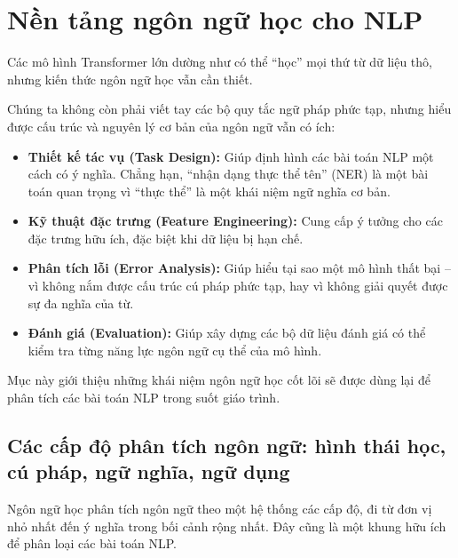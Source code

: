 
\section{Nền tảng ngôn ngữ học cho NLP}
\label{sec:nen_tang_ngon_ngu_hoc}

Các mô hình Transformer lớn dường như có thể “học” mọi thứ từ dữ liệu thô, nhưng kiến thức ngôn ngữ học vẫn cần thiết.

Chúng ta không còn phải viết tay các bộ quy tắc ngữ pháp phức tạp, nhưng hiểu được cấu trúc và nguyên lý cơ bản của ngôn ngữ vẫn có ích:
\begin{itemize}
    \item \textbf{Thiết kế tác vụ (Task Design):} Giúp định hình các bài toán NLP một cách có ý nghĩa. Chẳng hạn, “nhận dạng thực thể tên” (NER) là một bài toán quan trọng vì “thực thể” là một khái niệm ngữ nghĩa cơ bản.
    \item \textbf{Kỹ thuật đặc trưng (Feature Engineering):} Cung cấp ý tưởng cho các đặc trưng hữu ích, đặc biệt khi dữ liệu bị hạn chế.
    \item \textbf{Phân tích lỗi (Error Analysis):} Giúp hiểu tại sao một mô hình thất bại -- vì không nắm được cấu trúc cú pháp phức tạp, hay vì không giải quyết được sự đa nghĩa của từ.
    \item \textbf{Đánh giá (Evaluation):} Giúp xây dựng các bộ dữ liệu đánh giá có thể kiểm tra từng năng lực ngôn ngữ cụ thể của mô hình.
\end{itemize}

Mục này giới thiệu những khái niệm ngôn ngữ học cốt lõi sẽ được dùng lại để phân tích các bài toán NLP trong suốt giáo trình.

\subsection{Các cấp độ phân tích ngôn ngữ: hình thái học, cú pháp, ngữ nghĩa, ngữ dụng}
\label{ssec:cap_do_phan_tich}

Ngôn ngữ học phân tích ngôn ngữ theo một hệ thống các cấp độ, đi từ đơn vị nhỏ nhất đến ý nghĩa trong bối cảnh rộng nhất. Đây cũng là một khung hữu ích để phân loại các bài toán NLP.

